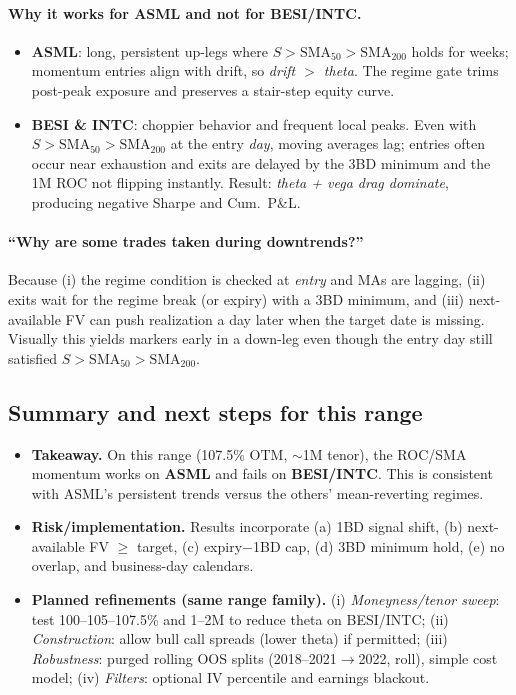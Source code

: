 \documentclass[12pt,a4paper]{report}
\begin{document}
\paragraph{Why it works for ASML and not for BESI/INTC.}
\begin{itemize}\itemsep2pt
  \item \textbf{ASML}: long, persistent up-legs where $S>\mathrm{SMA}_{50}>\mathrm{SMA}_{200}$ holds for weeks; momentum entries align with drift, so \emph{drift $>$ theta}. The regime gate trims post-peak exposure and preserves a stair-step equity curve.
  \item \textbf{BESI \& INTC}: choppier behavior and frequent local peaks. Even with $S>\mathrm{SMA}_{50}>\mathrm{SMA}_{200}$ at the entry \emph{day}, moving averages lag; entries often occur near exhaustion and exits are delayed by the 3BD minimum and the 1M ROC not flipping instantly. Result: \emph{theta + vega drag dominate}, producing negative Sharpe and Cum.\ P\&L.
\end{itemize}

\paragraph{“Why are some trades taken during downtrends?”}
Because (i) the regime condition is checked at \emph{entry} and MAs are lagging, (ii) exits wait for the regime break (or expiry) with a 3BD minimum, and (iii) next-available FV can push realization a day later when the target date is missing. Visually this yields markers early in a down-leg even though the entry day still satisfied $S>\mathrm{SMA}_{50}>\mathrm{SMA}_{200}$.

\subsection{Summary and next steps for this range}
\begin{itemize}\itemsep2pt
  \item \textbf{Takeaway.} On this range (107.5\% OTM, $\sim$1M tenor), the ROC/SMA momentum works on \textbf{ASML} and fails on \textbf{BESI/INTC}. This is consistent with ASML’s persistent trends versus the others’ mean-reverting regimes.
  \item \textbf{Risk/implementation.} Results incorporate (a) 1BD signal shift, (b) next-available FV $\ge$ target, (c) expiry$-$1BD cap, (d) 3BD minimum hold, (e) no overlap, and business-day calendars.
  \item \textbf{Planned refinements (same range family).} 
        (i) \emph{Moneyness/tenor sweep}: test 100–105–107.5\% and 1–2M to reduce theta on BESI/INTC; 
        (ii) \emph{Construction}: allow bull call spreads (lower theta) if permitted; 
        (iii) \emph{Robustness}: purged rolling OOS splits (2018–2021$\rightarrow$2022, roll), simple cost model; 
        (iv) \emph{Filters}: optional IV percentile and earnings blackout.
\end{itemize}
\end{document}
